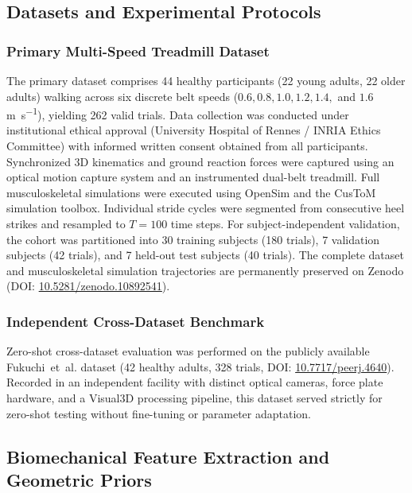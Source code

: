 \documentclass[fleqn,10pt]{wlscirep}
\begin{document}
\subsection{Datasets and Experimental Protocols}

\subsubsection{Primary Multi-Speed Treadmill Dataset}
The primary dataset comprises 44 healthy participants (22 young adults, 22 older adults) walking across six discrete belt speeds ($0.6, 0.8, 1.0, 1.2, 1.4,$ and $1.6$\,\si{\metre\per\second}), yielding 262 valid trials. Data collection was conducted under institutional ethical approval (University Hospital of Rennes / INRIA Ethics Committee) with informed written consent obtained from all participants. Synchronized 3D kinematics and ground reaction forces were captured using an optical motion capture system and an instrumented dual-belt treadmill. Full musculoskeletal simulations were executed using OpenSim\cite{delp2007opensim} and the CusToM simulation toolbox\cite{muller2019custom}. Individual stride cycles were segmented from consecutive heel strikes and resampled to $T=100$ time steps. For subject-independent validation, the cohort was partitioned into 30 training subjects (180 trials), 7 validation subjects (42 trials), and 7 held-out test subjects (40 trials). The complete dataset and musculoskeletal simulation trajectories are permanently preserved on Zenodo (DOI: \href{https://doi.org/10.5281/zenodo.10892541}{10.5281/zenodo.10892541})\cite{legoff2026sixspeed}.

\subsubsection{Independent Cross-Dataset Benchmark}
Zero-shot cross-dataset evaluation was performed on the publicly available Fukuchi~et~al.\cite{fukuchi2018public} dataset (42 healthy adults, 328 trials, DOI: \href{https://doi.org/10.7717/peerj.4640}{10.7717/peerj.4640}). Recorded in an independent facility with distinct optical cameras, force plate hardware, and a Visual3D processing pipeline, this dataset served strictly for zero-shot testing without fine-tuning or parameter adaptation.

\subsection{Biomechanical Feature Extraction and Geometric Priors}
\end{document}
